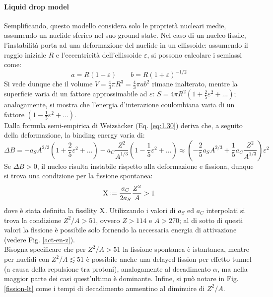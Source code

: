 \paragraph{Liquid drop model}

Semplificando, questo modello considera solo le proprietà nucleari medie, assumendo un nuclide sferico nel suo ground state. Nel caso di un nucleo fissile, l'instabilità porta ad una deformazione del nuclide in un ellissoide: assumendo il raggio iniziale $ R $ e l'eccentricità dell'ellissoide $ \varepsilon $, si possono calcolare i semiassi come:
\begin{equation}
	a = R \left( 1 + \varepsilon \right) \qquad b = R \left( 1 + \varepsilon \right)^{-1/2}
	\label{eq:2.18}
\end{equation}
Si vede dunque che il volume $ V = \frac{4}{3}\pi R^3 = \frac{4}{3} \pi ab^2 $ rimane inalterato, mentre la superficie varia di un fattore approssimabile ad $ \varepsilon $: $ S = 4\pi R^2 \left( 1 + \frac{2}{5} \varepsilon^2 + \dots \right) $; analogamente, si mostra che l'energia d'interazione coulombiana varia di un fattore $ \left( 1 - \frac{1}{5} \varepsilon^2 + \dots \right) $.\\
Dalla formula semi-empirica di Weizsäcker (Eq. \ref{eq:1.30}) deriva che, a seguito della deformazione, la binding energy varia di:
\begin{equation}
	\Delta B = - a_S A^{2/3} \left( 1 + \frac{2}{5} \varepsilon^2 + \dots \right) - a_C \frac{Z^2}{A^{1/3}} \left( 1 - \frac{1}{5} \varepsilon^2 + \dots \right) \approx \left( -\frac{2}{5} a_S A^{2/3} + \frac{1}{5} a_C \frac{Z^2}{A^{1/3}} \right) \varepsilon^2
	\label{eq:2.19}
\end{equation}
Se $ \Delta B > 0 $, il nucleo risulta instabile rispetto alla deformazione e fissiona, dunque si trova una condizione per la fissione spontanea:
\begin{equation}
	\Chi \defeq \frac{a_C}{2a_S} \frac{Z^2}{A} > 1
	\label{eq:2.20}
\end{equation}
dove è stata definita la fissility $ \mathrm{X} $. Utilizzando i valori di $ a_S $ ed $ a_C $ interpolati si trova la condizione $ Z^2 / A > 51 $, ovvero $ Z > 114 $ e $ A > 270 $; al di sotto di questi valori la fissione è possibile solo fornendo la necessaria energia di attivazione (vedere Fig. \ref{act-en-z}).\\
Bisogna specificare che per $ Z^2 / A > 51 $ la fissione spontanea è istantanea, mentre per nuclidi con $ Z^2 / A \lesssim 51 $ è possibile anche una delayed fission per effetto tunnel (a causa della repulsione tra protoni), analogamente al decadimento $ \alpha $, ma nella maggior parte dei casi quest'ultimo è dominante.
Infine, si può notare in Fig. \ref{fission-lt} come i tempi di decadimento aumentino al diminuire di $ Z^2 / A $.

